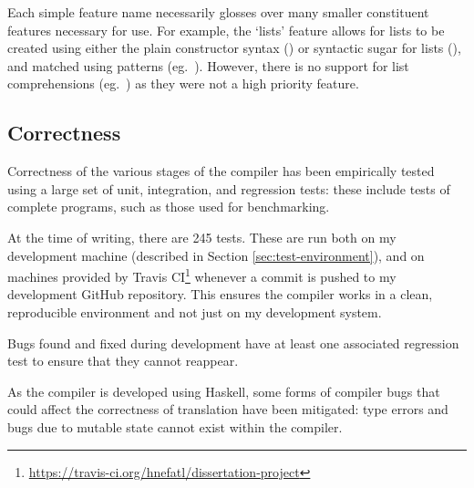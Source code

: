 \documentclass[dissertation.tex]{subfiles}
\begin{document}
{    Each simple feature name necessarily glosses over many smaller constituent features necessary for use. For example, the `lists' feature allows for lists to be created using either the plain constructor syntax () or syntactic sugar for lists (\haskell{[1,2,3]}), and matched using patterns (eg.\ \haskell{[x,y] = [1,2]}). However, there is no support for list comprehensions (eg.\ \haskell{[f x | x <- [1,2,3], even x]}) as they were not a high priority feature.
    
    \subsection{Correctness}
    {
        Correctness of the various stages of the compiler has been empirically tested using a large set of unit, integration, and regression tests: these include tests of complete programs, such as those used for benchmarking.
        
        At the time of writing, there are 245 tests. These are run both on my development machine (described in Section \ref{sec:test-environment}), and on machines provided by Travis CI\footnote{\url{https://travis-ci.org/hnefatl/dissertation-project}} whenever a commit is pushed to my development GitHub repository. This ensures the compiler works in a clean, reproducible environment and not just on my development system.

        Bugs found and fixed during development have at least one associated regression test to ensure that they cannot reappear.

        As the compiler is developed using Haskell, some forms of compiler bugs that could affect the correctness of translation have been mitigated: type errors and bugs due to mutable state cannot exist within the compiler.
    }
}
\end{document}
